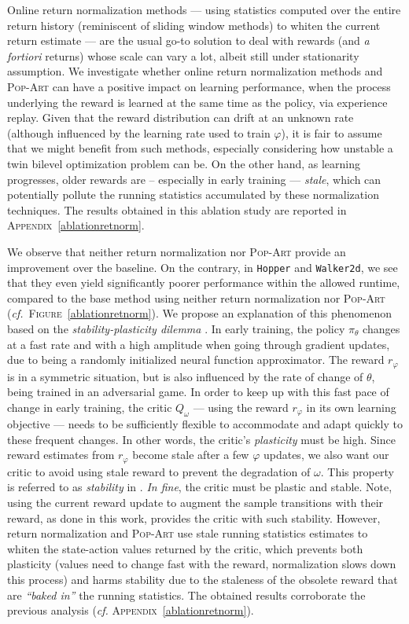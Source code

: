 Online return normalization methods ---
using statistics computed over the entire return history
(reminiscent of sliding window methods)
to whiten the current return estimate ---
are the usual go-to solution to deal with rewards (and \textit{a fortiori} returns)
whose scale can vary a lot, albeit still under stationarity assumption.
We investigate whether online return normalization methods
and \textsc{Pop-Art} \cite{Van_Hasselt2016-bh} can have a positive impact on learning performance,
when the process underlying the reward is learned at the same time as the policy,
via experience replay.
Given that the reward distribution can drift at an unknown rate
(although influenced by the learning rate used to train $\varphi$),
it is fair to assume that we might benefit from such methods,
especially considering how unstable a twin bilevel
optimization problem can be.
On the other hand, as learning progresses, older rewards are -- especially in early training ---
\emph{stale}, which can potentially pollute the running statistics accumulated
by these normalization techniques.
The results obtained in this ablation study are reported
in \textsc{Appendix}~\ref{ablationretnorm}.

We observe that neither return normalization nor \textsc{Pop-Art} provide an improvement
over the baseline.
On the contrary, in \texttt{Hopper} and \texttt{Walker2d},
we see that they even yield significantly
poorer performance within the allowed runtime,
compared to the base method using neither return normalization nor \textsc{Pop-Art}
(\textit{cf.}~\textsc{Figure}~\ref{ablationretnorm}).
We propose an explanation of this phenomenon
based on the \emph{stability-plasticity dilemma} \cite{Carpenter1987-wd}.
In early training, the policy $\pi_\theta$ changes at a fast rate and with a high amplitude
when going through gradient updates,
due to being a randomly initialized neural function approximator.
The reward $r_\varphi$ is in a symmetric situation, but is also influenced by the rate
of change of $\theta$, being trained in an adversarial game.
In order to keep up with this fast pace of change in early training,
the critic $Q_\omega$ --- using the reward $r_\varphi$ in its own learning objective ---
needs to be sufficiently flexible to accommodate and adapt quickly to these frequent changes.
In other words, the critic's \emph{plasticity} must be high.
Since reward estimates from $r_\varphi$ become stale after a few $\varphi$ updates,
we also want our critic to avoid using stale reward to prevent
the degradation of $\omega$.
This property is referred to as \emph{stability} in \cite{Carpenter1987-wd}.
\textit{In fine}, the critic must be plastic and stable.
Note, using the current reward update to augment the sample transitions with their reward,
as done in this work, provides the critic with such stability.
However, return normalization and \textsc{Pop-Art} use stale running statistics
estimates to whiten the state-action values returned by the critic,
which prevents both plasticity (values need to change fast with the reward,
normalization slows down this process)
and harms stability due to the staleness of the obsolete reward that are
\textit{``baked in''} the running statistics.
The obtained results corroborate the previous analysis
(\textit{cf.} \textsc{Appendix}~\ref{ablationretnorm}).

